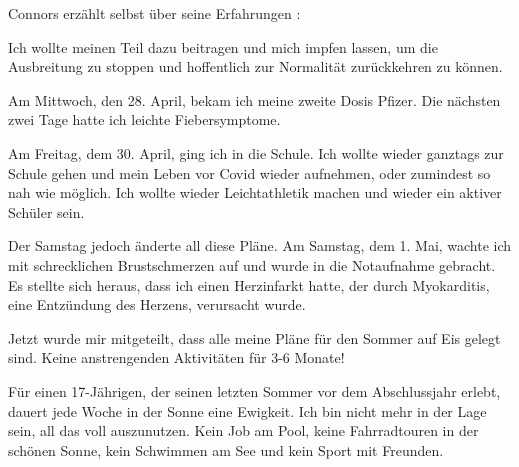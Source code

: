 Connors erzählt selbst über seine Erfahrungen :

Ich wollte meinen Teil dazu beitragen und mich impfen lassen, um die Ausbreitung
zu stoppen und hoffentlich zur Normalität zurückkehren zu können.

Am Mittwoch, den 28. April, bekam ich meine zweite Dosis Pfizer. Die nächsten
zwei Tage hatte ich leichte Fiebersymptome.

Am Freitag, dem 30. April, ging ich in die Schule. Ich wollte wieder ganztags
zur Schule gehen und mein Leben vor Covid wieder aufnehmen, oder zumindest so
nah wie möglich. Ich wollte wieder Leichtathletik machen und wieder ein aktiver
Schüler sein.

Der Samstag jedoch änderte all diese Pläne. Am Samstag, dem 1. Mai, wachte ich
mit schrecklichen Brustschmerzen auf und wurde in die Notaufnahme gebracht. Es
stellte sich heraus, dass ich einen Herzinfarkt hatte, der durch Myokarditis,
eine Entzündung des Herzens, verursacht wurde.

Jetzt wurde mir mitgeteilt, dass alle meine Pläne für den Sommer auf Eis gelegt
sind. Keine anstrengenden Aktivitäten für 3-6 Monate!

Für einen 17-Jährigen, der seinen letzten Sommer vor dem Abschlussjahr erlebt,
dauert jede Woche in der Sonne eine Ewigkeit. Ich bin nicht mehr in der Lage
sein, all das voll auszunutzen. Kein Job am Pool, keine Fahrradtouren in der
schönen Sonne, kein Schwimmen am See und kein Sport mit Freunden.
